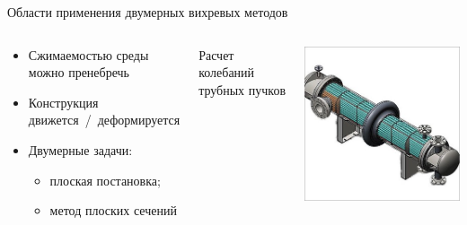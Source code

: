 \documentclass[ignoreonframetext,unicode]{beamer}
\begin{document}
	\begin{frame}{Области применения двумерных вихревых методов}
\small
		\begin{columns}\vspace*{-2.0mm}
			\begin{block}{}\vspace*{-1.0mm}
			\begin{itemize}
				\item Сжимаемостью среды можно пренебречь\vspace*{-1.0mm}
				\item Конструкция движется~/~деформируется\vspace*{-1.0mm}
				\item Двумерные задачи:\vspace*{-1.0mm}
					\begin{itemize}
						\item плоская постановка;\vspace*{-1.0mm}
						\item метод плоских сечений
					\end{itemize}
			\end{itemize}
			\end{block}
Расчет колебаний трубных пучков
				\begin{columns}
					\includegraphics[width=\textwidth]{ris1}

\end{columns}
\end{columns}
\end{frame}
\end{document}
